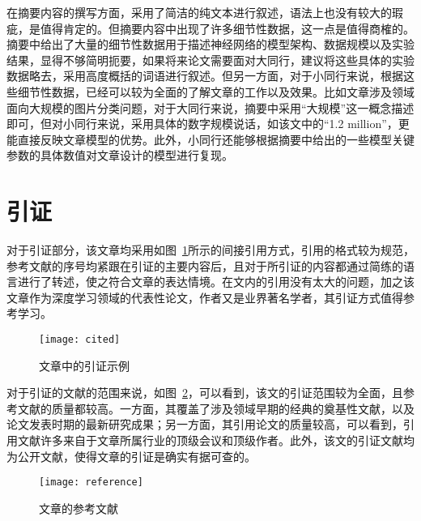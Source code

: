 在摘要内容的撰写方面，采用了简洁的纯文本进行叙述，语法上也没有较大的瑕疵，是值得肯定的。但摘要内容中出现了许多细节性数据，这一点是值得商榷的。摘要中给出了大量的细节性数据用于描述神经网络的模型架构、数据规模以及实验结果，显得不够简明扼要，如果将来论文需要面对大同行，建议将这些具体的实验数据略去，采用高度概括的词语进行叙述。但另一方面，对于小同行来说，根据这些细节性数据，已经可以较为全面的了解文章的工作以及效果。比如文章涉及领域面向大规模的图片分类问题，对于大同行来说，摘要中采用“大规模”这一概念描述即可，但对小同行来说，采用具体的数字规模说话，如该文中的“1.2 million”，更能直接反映文章模型的优势。此外，小同行还能够根据摘要中给出的一些模型关键参数的具体数值对文章设计的模型进行复现。

\section{引证}
对于引证部分，该文章均采用如图~\ref{fig:cited}所示的间接引用方式，引用的格式较为规范，参考文献的序号均紧跟在引证的主要内容后，且对于所引证的内容都通过简练的语言进行了转述，使之符合文章的表达情境。在文内的引用没有太大的问题，加之该文章作为深度学习领域的代表性论文，作者又是业界著名学者，其引证方式值得参考学习。
\begin{figure}[!htbp]
	\centering
	\texttt{[image: cited]}
	\caption{文章中的引证示例}
	\label{fig:cited}
\end{figure}

对于引证的文献的范围来说，如图~\ref{fig:reference}，可以看到，该文的引证范围较为全面，且参考文献的质量都较高。一方面，其覆盖了涉及领域早期的经典的奠基性文献，以及论文发表时期的最新研究成果；另一方面，其引用论文的质量较高，可以看到，引用文献许多来自于文章所属行业的顶级会议和顶级作者。此外，该文的引证文献均为公开文献，使得文章的引证是确实有据可查的。

\begin{figure}[!htbp]
	\centering
	\texttt{[image: reference]}
	\caption{文章的参考文献}
	\label{fig:reference}
\end{figure}
